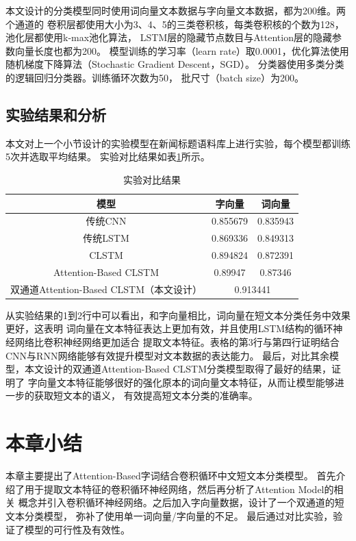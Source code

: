 本文设计的分类模型同时使用词向量文本数据与字向量文本数据，都为200维。两个通道的
卷积层都使用大小为3、4、5的三类卷积核，每类卷积核的个数为128，池化层都使用k-max池化算法，
LSTM层的隐藏节点数目与Attention层的隐藏参数向量长度也都为200。
模型训练的学习率（learn rate）取0.0001，优化算法使用随机梯度下降算法（Stochastic Gradient Descent，SGD）。
分类器使用多类分类的逻辑回归分类器。训练循环次数为50，
批尺寸（batch size）为200。
\subsection{实验结果和分析}
本文对上一个小节设计的实验模型在新闻标题语料库上进行实验，每个模型都训练5次并选取平均结果。
实验对比结果如表\ref{classification_result_table}所示。
\begin{table}[h]
    \caption{实验对比结果}
    \begin{tabular}{|c|c|c|}
        \hline
        模型 & 字向量 & 词向量 \\
        \hline
        传统CNN & 0.855679 & 0.835943 \\
        \hline
        传统LSTM & 0.869336 & 0.849313 \\
        \hline
        CLSTM & 0.894824 & 0.872391 \\
        \hline
        Attention-Based CLSTM & 0.89947 & 0.87346 \\
        \hline
        双通道Attention-Based CLSTM（本文设计） & \multicolumn{2}{|c|}{0.913441} \\
        \hline
    \end{tabular}
    \label{classification_result_table}
\end{table}
从实验结果的1到2行中可以看出，和字向量相比，词向量在短文本分类任务中效果更好，这表明
词向量在文本特征表达上更加有效，并且使用LSTM结构的循环神经网络比卷积神经网络更加适合
提取文本特征。表格的第3行与第四行证明结合CNN与RNN网络能够有效提升模型对文本数据的表达能力。
最后，对比其余模型，本文设计的双通道Attention-Based CLSTM分类模型取得了最好的结果，证明了
字向量文本特征能够很好的强化原本的词向量文本特征，从而让模型能够进一步的获取短文本的语义，
有效提高短文本分类的准确率。
\section{本章小结}
 本章主要提出了Attention-Based字词结合卷积循环中文短文本分类模型。
 首先介绍了用于提取文本特征的卷积循环神经网络，然后再分析了Attention Model的相关
 概念并引入卷积循环神经网络。之后加入字向量数据，设计了一个双通道的短文本分类模型，
 弥补了使用单一词向量/字向量的不足。
 最后通过对比实验，验证了模型的可行性及有效性。